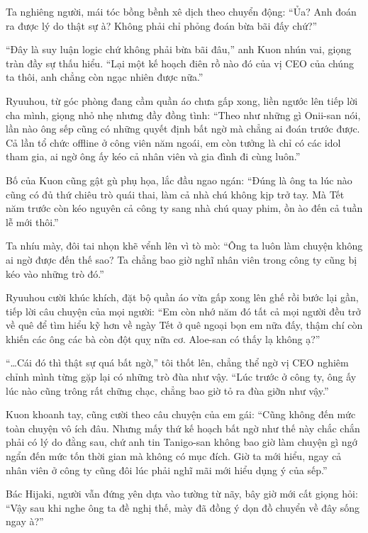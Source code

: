 \documentclass[../main.tex]{subfiles}
\begin{document}
Ta nghiêng người, mái tóc bồng bềnh xê dịch theo chuyển động: ``Ủa? Anh đoán ra được lý do thật sự à? Không phải chỉ phỏng đoán bừa bãi đấy chứ?''

``Đây là suy luận logic chứ không phải bừa bãi đâu,'' anh Kuon nhún vai, giọng tràn đầy sự thấu hiểu. ``Lại một kế hoạch điên rồ nào đó của vị CEO của chúng ta thôi, anh chẳng còn ngạc nhiên được nữa.''

Ryuuhou, từ góc phòng đang cầm quần áo chưa gấp xong, liền ngước lên tiếp lời cha mình, giọng nhỏ nhẹ nhưng đầy đồng tình: ``Theo như những gì Onii-san nói, lần nào ông sếp cũng có những quyết định bất ngờ mà chẳng ai đoán trước được. Cả lần tổ chức offline ở công viên năm ngoái, em còn tưởng là chỉ có các idol tham gia, ai ngờ ông ấy kéo cả nhân viên và gia đình đi cùng luôn.''

Bố của Kuon cũng gật gù phụ họa, lắc đầu ngao ngán: ``Đúng là ông ta lúc nào cũng có đủ thứ chiêu trò quái thai, làm cả nhà chú không kịp trở tay. Mà Tết năm trước còn kéo nguyên cả công ty sang nhà chú quay phim, ồn ào đến cả tuần lễ mới thôi.''

Ta nhíu mày, đôi tai nhọn khẽ vểnh lên vì tò mò: ``Ông ta luôn làm chuyện không ai ngờ được đến thế sao? Ta chẳng bao giờ nghĩ nhân viên trong công ty cũng bị kéo vào những trò đó.''

Ryuuhou cười khúc khích, đặt bộ quần áo vừa gấp xong lên ghế rồi bước lại gần, tiếp lời câu chuyện của mọi người: ``Em còn nhớ năm đó tất cả mọi người đều trở về quê để tìm hiểu kỹ hơn về ngày Tết ở quê ngoại bọn em nữa đấy, thậm chí còn khiến các ông các bà còn đột quỵ nữa cơ. Aloe-san có thấy lạ không ạ?''

``\dots Cái đó thì thật sự quá bất ngờ,'' tôi thốt lên, chẳng thể ngờ vị CEO nghiêm chỉnh mình từng gặp lại có những trò đùa như vậy. ``Lúc trước ở công ty, ông ấy lúc nào cũng trông rất chững chạc, chẳng bao giờ tỏ ra đùa giỡn như vậy.''

Kuon khoanh tay, cũng cười theo câu chuyện của em gái: ``Cũng không đến mức toàn chuyện vô ích đâu. Nhưng mấy thứ kế hoạch bất ngờ như thế này chắc chắn phải có lý do đằng sau, chứ anh tin Tanigo-san không bao giờ làm chuyện gì ngớ ngẩn đến mức tốn thời gian mà không có mục đích. Giờ ta mới hiểu, ngay cả nhân viên ở công ty cũng đôi lúc phải nghĩ mãi mới hiểu dụng ý của sếp.''

Bác Hijaki, người vẫn đứng yên dựa vào tường từ nãy, bây giờ mới cất giọng hỏi: ``Vậy sau khi nghe ông ta đề nghị thế, mày đã đồng ý dọn đồ chuyển về đây sống ngay à?''
\end{document}

